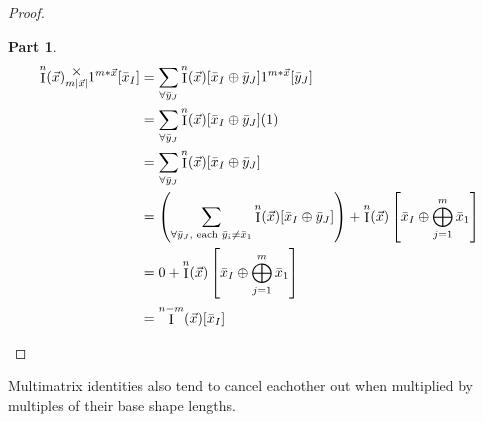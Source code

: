 \documentclass[12pt]{book}
\theoremstyle{plain}
\theoremstyle{definition}
\theoremstyle{ppart}
\newtheorem{ppart}{Part}
\theoremstyle{case}
\theoremstyle{solution}
\DeclareMathOperator{\Ident}{I}
\newcommand{\mmult}[1]{\text{\raisebox{1ex}{$\underset{#1}{\times}$}}}
\newcommand{\shape}[1]{\left|#1\right|}
\begin{document}
\begin{proof}
\begin{ppart}
\begin{align*}
  \Ident^n(\vec{x}) \mmult{m \shape{\vec{x}}} 1^{m*\vec{x}} [\bar{x}_I] &=
  \sum_{\forall \bar{y}_J} \Ident^n(\vec{x})[\bar{x}_I \oplus \bar{y}_J] 1^{m*\vec{x}}[\bar{y}_J] \\
  &=
  \sum_{\forall \bar{y}_J} \Ident^n(\vec{x})[\bar{x}_I \oplus \bar{y}_J] (1) \\
  &=
  \sum_{\forall \bar{y}_J} \Ident^n(\vec{x})[\bar{x}_I \oplus \bar{y}_J] \\
  &=
  \left(
    \sum_{\forall \bar{y}_J, \text{ each } \bar{y}_i \ne \bar{x}_1} \Ident^n(\vec{x})[\bar{x}_I \oplus \bar{y}_J]
  \right)
  + \Ident^n(\vec{x})\left[\bar{x}_I \oplus \bigoplus_{j=1}^m \bar{x}_1 \right] \\
  &= 0 + \Ident^n(\vec{x})\left[\bar{x}_I \oplus \bigoplus_{j=1}^m \bar{x}_1 \right] \\
  &= \Ident^{n-m}(\vec{x})[\bar{x}_I]
\end{align*}
\end{ppart}
\end{proof}

Multimatrix identities also tend to cancel eachother out when multiplied by
multiples of their base shape lengths.
\end{document}
